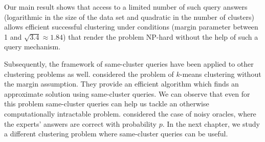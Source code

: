 \documentclass[12pt]{article}
\begin{document}
Our main result shows that access to a limited number of such query answers (logarithmic in the size of the data set and quadratic in the number of clusters) allows efficient successful clustering under conditions (margin parameter between 1 and $\sqrt{3.4} \approx 1.84$) that render the problem NP-hard without the help of such a query mechanism.  
 
Subsequently, the framework of same-cluster queries have been applied to other clustering problems as well. \cite{ailon2017approximate} considered the problem of $k$-means clustering without the margin assumption. They provide an efficient algorithm which finds an approximate solution using same-cluster queries. We can observe that even for this problem same-cluster queries can help us tackle an otherwise computationally intractable problem. \cite{mazumdar2017clustering} considered the case of noisy oracles, where the experts' answers are correct with probability $p$. In the next chapter, we study a different clustering problem where same-cluster queries can be useful.

\ifdefined\COMPLETE
\else
\end{document}
